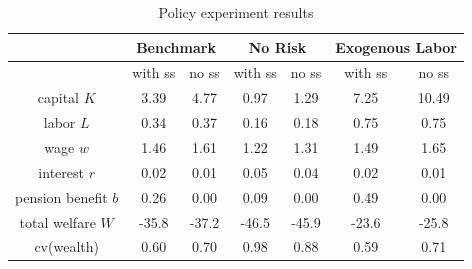 \documentclass[12pt]{article}
\begin{document}
\begin{table}[h!]
    \centering
    \begin{tabular}{|c|c|c|c|c|c|c|}
    \hline
         & \multicolumn{2}{c|}{Benchmark} & \multicolumn{2}{c|}{No Risk} & \multicolumn{2}{c|}{Exogenous Labor} \\
         \hline 
         & with ss & no ss & with ss & no ss & with ss & no ss \\
         \hline
         capital $K$ & 3.39 & 4.77 & 0.97 & 1.29 & 7.25 & 10.49 \\
         labor $L$ & 0.34 & 0.37 & 0.16 & 0.18 & 0.75 & 0.75 \\
         wage $w$  & 1.46 & 1.61 & 1.22 & 1.31 & 1.49 & 1.65 \\
         interest $r$ & 0.02 & 0.01 & 0.05 & 0.04 & 0.02 & 0.01\\
         pension benefit $b$ & 0.26 & 0.00 & 0.09 & 0.00 & 0.49 & 0.00 \\
         total welfare $W$ & -35.8 & -37.2 & -46.5 & -45.9 & -23.6 & -25.8\\
         cv(wealth) & 0.60 & 0.70 & 0.98 & 0.88 & 0.59 & 0.71 \\
         \hline 
    \end{tabular}
    \caption{Policy experiment results }
    \label{tab:policyres}
\end{table}
\end{document}
